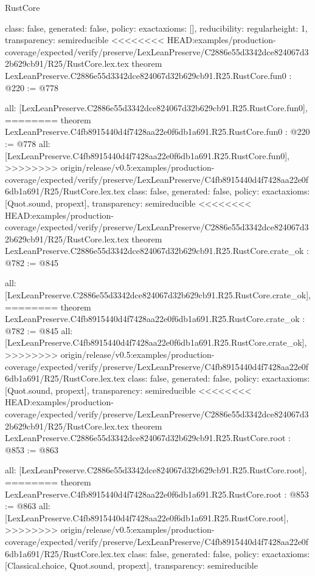 \begin{lexlean}{RustCore}
\begin{coremodule}
{\begin{coremodule}
{{{  class: false,
  generated: false,
  policy: exact{axioms: []},
  reducibility: regular{height: 1},
  transparency: semireducible
}
<<<<<<<< HEAD:examples/production-coverage/expected/verify/preserve/LexLeanPreserve/C2886e55d3342dce824067d32b629cb91/R25/RustCore.lex.tex
theorem LexLeanPreserve.C2886e55d3342dce824067d32b629cb91.R25.RustCore.fun0 : @220 := @778 {
  all: [LexLeanPreserve.C2886e55d3342dce824067d32b629cb91.R25.RustCore.fun0],
========
theorem LexLeanPreserve.C4fb8915440d4f7428aa22e0f6db1a691.R25.RustCore.fun0 : @220 := @778 {
  all: [LexLeanPreserve.C4fb8915440d4f7428aa22e0f6db1a691.R25.RustCore.fun0],
>>>>>>>> origin/release/v0.5:examples/production-coverage/expected/verify/preserve/LexLeanPreserve/C4fb8915440d4f7428aa22e0f6db1a691/R25/RustCore.lex.tex
  class: false,
  generated: false,
  policy: exact{axioms: [Quot.sound, propext]},
  transparency: semireducible
}
<<<<<<<< HEAD:examples/production-coverage/expected/verify/preserve/LexLeanPreserve/C2886e55d3342dce824067d32b629cb91/R25/RustCore.lex.tex
theorem LexLeanPreserve.C2886e55d3342dce824067d32b629cb91.R25.RustCore.crate_ok : @782 := @845 {
  all: [LexLeanPreserve.C2886e55d3342dce824067d32b629cb91.R25.RustCore.crate_ok],
========
theorem LexLeanPreserve.C4fb8915440d4f7428aa22e0f6db1a691.R25.RustCore.crate_ok : @782 := @845 {
  all: [LexLeanPreserve.C4fb8915440d4f7428aa22e0f6db1a691.R25.RustCore.crate_ok],
>>>>>>>> origin/release/v0.5:examples/production-coverage/expected/verify/preserve/LexLeanPreserve/C4fb8915440d4f7428aa22e0f6db1a691/R25/RustCore.lex.tex
  class: false,
  generated: false,
  policy: exact{axioms: [Quot.sound, propext]},
  transparency: semireducible
}
<<<<<<<< HEAD:examples/production-coverage/expected/verify/preserve/LexLeanPreserve/C2886e55d3342dce824067d32b629cb91/R25/RustCore.lex.tex
theorem LexLeanPreserve.C2886e55d3342dce824067d32b629cb91.R25.RustCore.root : @853 := @863 {
  all: [LexLeanPreserve.C2886e55d3342dce824067d32b629cb91.R25.RustCore.root],
========
theorem LexLeanPreserve.C4fb8915440d4f7428aa22e0f6db1a691.R25.RustCore.root : @853 := @863 {
  all: [LexLeanPreserve.C4fb8915440d4f7428aa22e0f6db1a691.R25.RustCore.root],
>>>>>>>> origin/release/v0.5:examples/production-coverage/expected/verify/preserve/LexLeanPreserve/C4fb8915440d4f7428aa22e0f6db1a691/R25/RustCore.lex.tex
  class: false,
  generated: false,
  policy: exact{axioms: [Classical.choice, Quot.sound, propext]},
  transparency: semireducible
}

}}}}}
\end{coremodule}}
\end{coremodule}
\end{lexlean}
